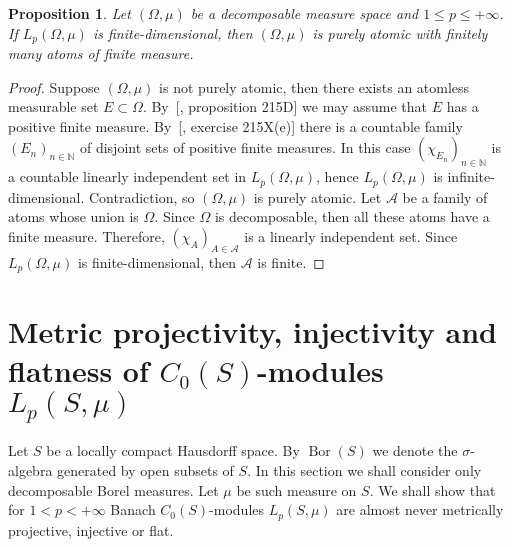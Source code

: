 \documentclass[12pt]{article}
\newtheorem{proposition}[theorem]{Proposition}
\begin{document}
\begin{proposition}\label{LpFinDimCharac}
    Let $(\Omega,\mu)$ be a decomposable measure space 
    and $1\leq p\leq+\infty$. If $L_p(\Omega,\mu)$ is finite-dimensional, 
    then $(\Omega,\mu)$ is purely atomic with finitely many atoms of 
    finite measure.
\end{proposition} 
\begin{proof}
    Suppose $(\Omega,\mu)$ is not purely atomic, then there exists an atomless 
    measurable set $E\subset \Omega$. By~[\cite{FremMeasTh2}, proposition 215D] 
    we may assume that $E$ has a positive finite measure. 
    By~[\cite{FremMeasTh2}, exercise 215X(e)] there is a countable 
    family $(E_n)_{n\in\mathbb{N}}$ of disjoint sets of positive finite 
    measures. In this case $(\chi_{E_n})_{n\in\mathbb{N}}$ is a countable 
    linearly independent set in $L_p(\Omega,\mu)$, hence $L_p(\Omega,\mu)$ is 
    infinite-dimensional. Contradiction, so $(\Omega,\mu)$ is purely atomic. 
    Let $\mathcal{A}$ be a family of atoms whose union is $\Omega$. 
    Since $\Omega$ is decomposable, then all these atoms have a finite measure. 
    Therefore, $(\chi_{A})_{A\in\mathcal{A}}$ is a linearly independent set. 
    Since $L_p(\Omega,\mu)$ is finite-dimensional, then $\mathcal{A}$ is finite.
\end{proof}


\section{Metric projectivity, injectivity and flatness of 
\texorpdfstring{$C_0(S)$}{C0(S)}-modules 
\texorpdfstring{$L_p(S,\mu)$}{LpSmu}}
\label{MetrProInjFltOfC0SModLp}

Let $S$ be a locally compact Hausdorff space. By $\operatorname{Bor}(S)$ we 
denote the $\sigma$-algebra generated by open subsets of $S$. In this section 
we shall consider only decomposable Borel measures. Let $\mu$ be such measure 
on $S$. We shall show that for $1<p<+\infty$ Banach $C_0(S)$-modules 
$L_p(S,\mu)$ are almost never metrically projective, injective or flat. 
\end{document}
